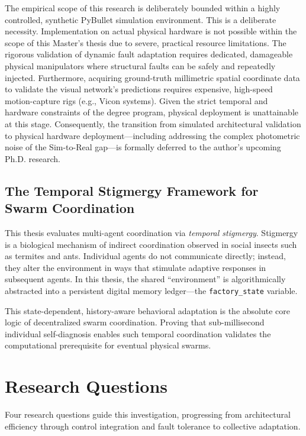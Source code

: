 \documentclass[12pt,a4paper,oneside]{report}
\begin{document}
The empirical scope of this research is deliberately bounded within a highly controlled, synthetic PyBullet simulation environment. This is a deliberate necessity. Implementation on actual physical hardware is not possible within the scope of this Master's thesis due to severe, practical resource limitations. The rigorous validation of dynamic fault adaptation requires dedicated, damageable physical manipulators where structural faults can be safely and repeatedly injected. Furthermore, acquiring ground-truth millimetric spatial coordinate data to validate the visual network's predictions requires expensive, high-speed motion-capture rigs (e.g., Vicon systems). Given the strict temporal and hardware constraints of the degree program, physical deployment is unattainable at this stage. Consequently, the transition from simulated architectural validation to physical hardware deployment---including addressing the complex photometric noise of the Sim-to-Real gap---is formally deferred to the author's upcoming Ph.D. research.

\subsection{The Temporal Stigmergy Framework for Swarm Coordination}
\label{subsec:temporal_stigmergy_framework_intro}

This thesis evaluates multi-agent coordination via \textit{temporal stigmergy}. Stigmergy is a biological mechanism of indirect coordination observed in social insects such as termites and ants. Individual agents do not communicate directly; instead, they alter the environment in ways that stimulate adaptive responses in subsequent agents. In this thesis, the shared ``environment'' is algorithmically abstracted into a persistent digital memory ledger---the \texttt{factory\_state} variable. 

This state-dependent, history-aware behavioral adaptation is the absolute core logic of decentralized swarm coordination. Proving that sub-millisecond individual self-diagnosis enables such temporal coordination validates the computational prerequisite for eventual physical swarms.

\section{Research Questions}
\label{sec:research_questions_intro}

Four research questions guide this investigation, progressing from architectural efficiency through control integration and fault tolerance to collective adaptation.
\end{document}
